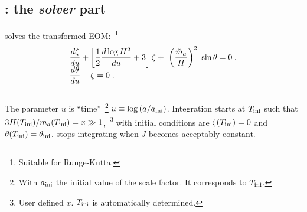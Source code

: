 \documentclass[10pt,utf8,compress,xcolor=dvipsnames]{beamer}
\begin{document}
\subsection{\mimes: the \emph{solver} part}
\begin{frame}{\insertsubsectionhead}
		\vspace{-0.2cm}
		\mimes solves the transformed EOM:~\footnote{Suitable for Runge-Kutta.}
		\begin{eqnarray*}\vspace*{-0.5cm}
			& \dfrac{d  \zeta}{du} + \lrsb{\dfrac{1}{2} \dfrac{d \log H^2}{du} + 3 } \zeta + \ \lrb{\dfrac{\maT}{H}}^2 \ \sin \theta
			=0 \;. \\[-0.2cm]
			&\dfrac{d \theta}{d u} - \zeta=0 \;.
		\end{eqnarray*}\\[-0.2cm]
		The parameter $u$ is ``time''~\footnote{\fontF With $a_{\rm ini}{}$ the initial value of the scale factor. It corresponds to $T_{\rm ini}{}$.} $u \equiv \log \left( a/a_{\rm ini}{} \right)$.
		Integration starts at $T_{\rm ini}{}$ such that $3H(T_{\rm ini}{})/m_{a}{}(T_{\rm ini}{}) = x \gg 1$,~\footnote{User defined $x$. $T_{\rm ini}{}$ is automatically determined.}	
		with initial conditions are $\zeta(T_{\rm ini}{})=0$ and $\theta(T_{\rm ini}{})=\theta_{\rm ini}{}$.	
		\mimes stops integrating when $J$ becomes acceptably constant.
\end{frame}
%	
%	
%	
%	
\end{document}
